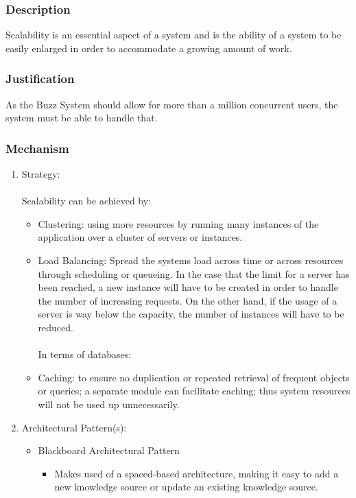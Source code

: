 \subsubsection*{Description}
	Scalability is an essential aspect of a system and is the ability of a system to be easily enlarged in order to accommodate a growing amount of work.
	\subsubsection*{Justification}
	 As the Buzz System should allow for more than a million concurrent users, the system must be able to handle that.
	\subsubsection*{Mechanism}
		\begin{enumerate}
			\item Strategy:\\\\
			Scalability can be achieved by:
			\begin{itemize}
			\item Clustering: using more resources by running many instances of the application over a cluster of servers or instances.
			\item Load Balancing: Spread the systems load across time or across resources through scheduling or queueing. In the case that the limit for a server has been reached, a new instance will have to be created in order to handle the number of increasing requests. On the other hand, if the usage of a server is way below the capacity, the number of instances will have to be reduced.\\\\
			In terms of databases:
			\item Caching: to ensure no duplication or repeated retrieval of frequent objects or queries; a separate module can facilitate caching; thus system resources will not be used up unnecessarily.
			 \end{itemize}
			\item Architectural Pattern(s):
			\begin{itemize}
			\item Blackboard Architectural Pattern
				\begin{itemize}
					\item Makes used of a spaced-based architecture, making it easy to add a new knowledge source or update an existing knowledge source.
				 \end{itemize}
			 \end{itemize}
		\end{enumerate}

